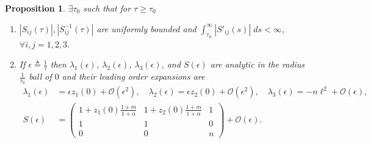 \documentclass[a4paper,11pt]{article}
\def\l{{\ell}}
\newtheorem{proposition}{Proposition}[section]
\theoremstyle{remark}
\begin{document}
\begin{proposition}\label{prop:ctsdiag} $\exists \tau_0$ such that for $\tau\ge \tau_0$%
 \begin{enumerate}
  \item $|S_{ij}(\tau)|, |S^{-1}_{ij}(\tau)|$ are uniformly bounded and %
  $\int_{\tau_0}^\infty |{S}'_{ij}(s)|\; ds <\infty$, $\forall i,j=1,2,3$.
  \item If $\epsilon\triangleq \frac{1}{\tau}$ then $\lambda_1(\epsilon)$, $\lambda_2(\epsilon)$, $\lambda_3(\epsilon)$, and $S(\epsilon)$ are analytic in the radius $\frac{1}{\tau_0}$ ball of $0$ and their leading order expansions are
  \begin{align}
   \lambda_1(\epsilon) & = \epsilon z_1(0) + \mathcal{O}(\epsilon^2),\quad %
   \lambda_2(\epsilon) = \epsilon z_2(0) + \mathcal{O}(\epsilon^2),\quad %
   \lambda_3(\epsilon) = -n\l^2 + \mathcal{O}(\epsilon),\\%
   S(\epsilon)
   &=\begin{pmatrix}
    1 + z_1(0)\frac{1+m}{1+\alpha} & 1 + z_2(0)\frac{1+m}{1+\alpha} & 1 \label{eq:S(0)}\\
    1 & 1 & 0\\
    0 & 0 & n
   \end{pmatrix} + \mathcal{O}(\epsilon).%
  \end{align}
 \end{enumerate}
\end{proposition}
\end{document}
